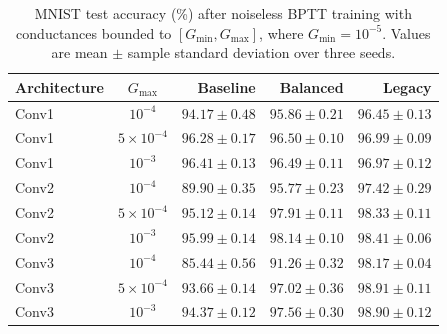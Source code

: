 \begin{table}[!htbp]
\centering
\small
\setlength{\tabcolsep}{6pt}
\begin{tabular}{lcrrr}
\toprule
Architecture & $G_{\max}$ & Baseline & Balanced & Legacy \\
\midrule
Conv1 & $10^{-4}$ & $94.17 \pm 0.48$ & $95.86 \pm 0.21$ & $96.45 \pm 0.13$ \\
Conv1 & $5\times10^{-4}$ & $96.28 \pm 0.17$ & $96.50 \pm 0.10$ & $96.99 \pm 0.09$ \\
Conv1 & $10^{-3}$ & $96.41 \pm 0.13$ & $96.49 \pm 0.11$ & $96.97 \pm 0.12$ \\
\addlinespace
Conv2 & $10^{-4}$ & $89.90 \pm 0.35$ & $95.77 \pm 0.23$ & $97.42 \pm 0.29$ \\
Conv2 & $5\times10^{-4}$ & $95.12 \pm 0.14$ & $97.91 \pm 0.11$ & $98.33 \pm 0.11$ \\
Conv2 & $10^{-3}$ & $95.99 \pm 0.14$ & $98.14 \pm 0.10$ & $98.41 \pm 0.06$ \\
\addlinespace
Conv3 & $10^{-4}$ & $85.44 \pm 0.56$ & $91.26 \pm 0.32$ & $98.17 \pm 0.04$ \\
Conv3 & $5\times10^{-4}$ & $93.66 \pm 0.14$ & $97.02 \pm 0.36$ & $98.91 \pm 0.11$ \\
Conv3 & $10^{-3}$ & $94.37 \pm 0.12$ & $97.56 \pm 0.30$ & $98.90 \pm 0.12$ \\
\bottomrule
\end{tabular}
\caption{MNIST test accuracy (\%) after noiseless BPTT training with conductances bounded to $[G_{\min},G_{\max}]$, where $G_{\min}=10^{-5}$. Values are mean $\pm$ sample standard deviation over three seeds.}
\label{tab:bounded-weights-test}
\end{table}

